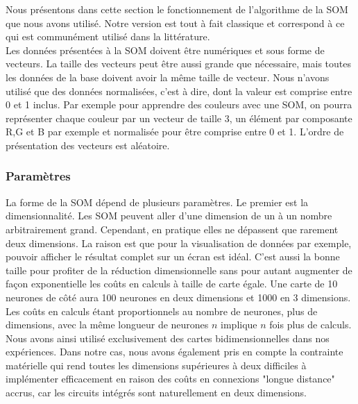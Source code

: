 	Nous présentons dans cette section le fonctionnement de l'algorithme de la SOM que nous avons utilisé. Notre version est tout à fait classique et correspond à ce qui est communément utilisé dans la littérature.\\

	Les données présentées à la SOM doivent être numériques et sous forme de vecteurs. La taille des vecteurs peut être aussi grande que nécessaire, mais toutes les données de la base doivent avoir la même taille de vecteur. Nous n'avons utilisé que des données normalisées, c'est à dire, dont la valeur est comprise entre 0 et 1 inclus. Par exemple pour apprendre des couleurs avec une SOM, on pourra représenter chaque couleur par un vecteur de taille 3, un élément par composante R,G et B par exemple et normalisée pour être comprise entre 0 et 1. L'ordre de présentation des vecteurs est aléatoire.

\subsubsection{Paramètres}\label{param_som}

	La forme de la SOM dépend de plusieurs paramètres. Le premier est la dimensionnalité. Les SOM peuvent aller d'une dimension de un à un nombre arbitrairement grand. Cependant, en pratique elles ne dépassent que rarement deux dimensions. La raison est que pour la visualisation de données par exemple, pouvoir afficher le résultat complet sur un écran est idéal. C'est aussi la bonne taille pour profiter de la réduction dimensionnelle sans pour autant augmenter de façon exponentielle les coûts en calculs à taille de carte égale. Une carte de 10 neurones de côté aura 100 neurones en deux dimensions et 1000 en 3 dimensions. Les coûts en calculs étant proportionnels au nombre de neurones, plus de dimensions, avec la même longueur de neurones $n$ implique $n$ fois plus de calculs. Nous avons ainsi utilisé exclusivement des cartes bidimensionnelles dans nos expériences. Dans notre cas, nous avons également pris en compte la contrainte matérielle qui rend toutes les dimensions supérieures à deux difficiles à implémenter efficacement en raison des coûts en connexions "longue distance" accrus, car les circuits intégrés sont naturellement en deux dimensions.
	

